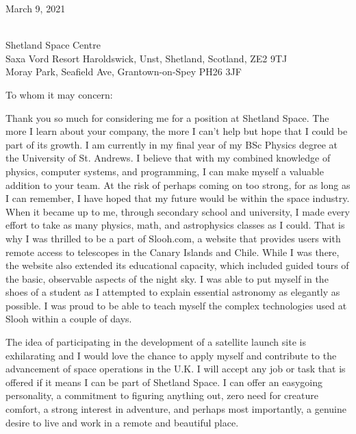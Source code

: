 \documentclass[a4paper, 12pt]{article}
\begin{document}
\pagestyle{empty}


\noindent March 9, 2021
\begin{tabbing}
\\ Shetland Space Centre
\\ Saxa Vord Resort Haroldswick, Unst, Shetland, Scotland, ZE2 9TJ
\\ Moray Park, Seafield Ave, Grantown-on-Spey PH26 3JF
\end{tabbing}



 \color{black}
\vspace{1em}
\noindent To whom it may concern:
\vspace{2em}

Thank you so much for considering me for a position at Shetland Space. The more I learn about your company, the more I can't help but hope that I could be part of its growth. I am currently in my final year of my BSc Physics degree at the University of St. Andrews. I believe that with my combined knowledge of physics, computer systems, and programming, I can make myself a valuable addition to your team.
At the risk of perhaps coming on too strong, for as long as I can remember, I have hoped that my future would be within the space industry. When it became up to me, through secondary school and university, I made every effort to take as many physics, math, and astrophysics classes as I could. That is why I was thrilled to be a part of Slooh.com, a website that provides users with remote access to telescopes in the Canary Islands and Chile. While I was there, the website also extended its educational capacity, which included guided tours of the basic, observable aspects of the night sky. I was able to put myself in the shoes of a student as I attempted to explain essential astronomy as elegantly as possible. I was proud to be able to teach myself the complex technologies used at Slooh within a couple of days.

\vspace{1em}
The idea of participating in the development of a satellite launch site is exhilarating and I would love the chance to apply myself and contribute to the advancement of space operations in the U.K. I will accept any job or task that is offered if it means I can be part of Shetland Space. I can offer an easygoing personality, a commitment to figuring anything out, zero need for creature comfort, a strong interest in adventure, and perhaps most importantly, a genuine desire to live and work in a remote and beautiful place.
\end{document}

